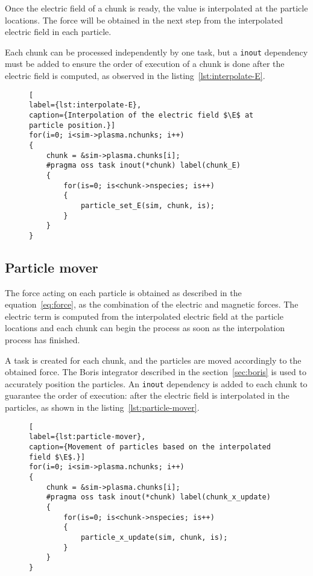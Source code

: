%
Once the electric field of a chunk is ready, the value is interpolated at the 
particle locations. The force will be obtained in the next step from the 
interpolated electric field in each particle.

Each chunk can be processed independently by one task, but a \texttt{inout} 
dependency must be added to ensure the order of execution of a chunk is done 
after the electric field is computed, as observed in the 
listing~\ref{lst:interpolate-E}.
%
\begin{figure}[ht]%
\begin{lstlisting}[
label={lst:interpolate-E},
caption={Interpolation of the electric field $\E$ at particle position.}]
for(i=0; i<sim->plasma.nchunks; i++)
{
	chunk = &sim->plasma.chunks[i];
	#pragma oss task inout(*chunk) label(chunk_E)
	{
		for(is=0; is<chunk->nspecies; is++)
		{
			particle_set_E(sim, chunk, is);
		}
	}
}
\end{lstlisting}
\end{figure}%
%
\subsection{Particle mover}

The force acting on each particle is obtained as described in the 
equation~\ref{eq:force}, as the combination of the electric and magnetic forces.  
The electric term is computed from the interpolated electric field at the 
particle locations and each chunk can begin the process as soon as the 
interpolation process has finished.

A task is created for each chunk, and the particles are moved accordingly to the 
obtained force. The Boris integrator described in the section~\ref{sec:boris} is 
used to accurately position the particles. An \texttt{inout} dependency is added 
to each chunk to guarantee the order of execution: after the electric field is 
interpolated in the particles, as shown in the listing~\ref{lst:particle-mover}.
%
\begin{figure}[ht]%
\begin{lstlisting}[
label={lst:particle-mover},
caption={Movement of particles based on the interpolated field $\E$.}]
for(i=0; i<sim->plasma.nchunks; i++)
{
	chunk = &sim->plasma.chunks[i];
	#pragma oss task inout(*chunk) label(chunk_x_update)
	{
		for(is=0; is<chunk->nspecies; is++)
		{
			particle_x_update(sim, chunk, is);
		}
	}
}
\end{lstlisting}
\end{figure}%
